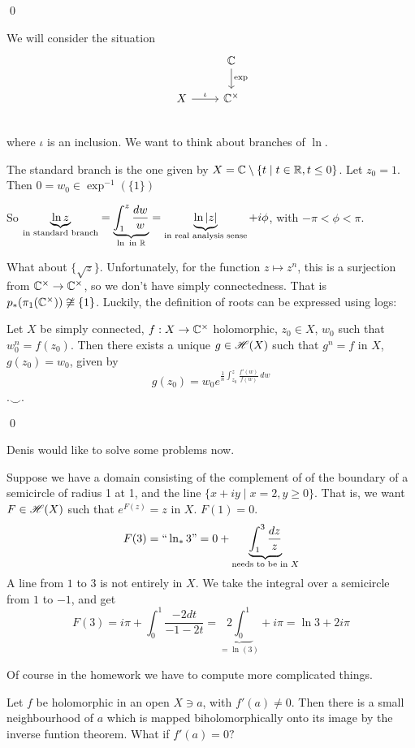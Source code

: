 \documentclass[x11names,reqno,14pt]{extarticle}
\begin{document}
\qed

We will consider the situation
\[
\begin{tikzcd}
& \C \ar[d, "\exp"] \\ X \ar[r, "\iota"] & \C^\times \\ 
\end{tikzcd}
\]
where $\iota$ is an inclusion. We want to think about branches of $\ln$. 

The standard branch is the one given by $X = \mathbb{C}\setminus\{t \mid t \in \mathbb{R}, t \leq0 \}$. Let $z_0 = 1$. Then $0 = w_0\in \exp^{-1}(\{1\})$

So $\underbrace{\ln z}_{\text{in standard branch}} = \underbrace{\int_1^z\frac{dw}{w}}_{\ln \text{ in }\mathbb{R}} = \underbrace{\ln|z|}_{\text{in real analysis sense}} + i\phi$, with $-\pi < \phi < \pi$.

What about $\{\sqrt{z}\}$. Unfortunately, for the function $z\mapsto z^n$, this is a surjection from $\mathbb{C}^\times\to\mathbb{C}^\times$, so we don't have simply connectedness. That is $p_*(\pi_1(\mathbb{C}^\times)) \not\cong \{1\}$. Luckily, the definition of roots can be expressed using logs:

\thm

Let $X$ be simply connected, $f:X\to\mathbb{C}^\times$ holomorphic, $z_0 \in X$, $w_0$ such that $w_0^n = f(z_0)$. Then there exists a unique $g \in \mathscr{H}(X)$ such that $g^n = f$ in $X$, $g(z_0) = w_0$, given by
\[
g(z_0) = w_0e^{\frac{1}{n}\int_{z_0}^z\frac{f'(w)}{f(w)}\,dw}
\] 

\proof

$\cdot\smile\cdot$

\qed

Denis would like to solve some problems now. 

Suppose we have a domain consisting of the complement of of the boundary of a semicircle of radius 1 at 1, and the line $\{x + iy \mid x = 2, y \geq 0\}$. That is, we want $F \in\mathscr{H}(X)$ such that $e^{F(z)} = z$ in $X$. $F(1) = 0$. 
\[
F(3) = ``\ln_* 3" = 0 + \underbrace{\int_1^3\frac{dz}{z}}_{\text{needs to be in }X}
\]
A line from $1$ to $3$ is not entirely in $X$. We take the integral over a semicircle from $1$ to $-1$, and get
\[
F(3) =i\pi + \int_0^1\frac{-2dt}{-1 - 2t} = \underbrace{2\int_0^1}_{=\ln(3)} + i\pi = \ln 3 + 2i\pi
\]

Of course in the homework we have to compute more complicated things.

Let $f$ be holomorphic in an open $X\ni a$, with $f'(a)\neq0$. Then there is a small neighbourhood of $a$ which is mapped biholomorphically onto its image by the inverse funtion theorem. What if $f'(a) = 0?$
\end{document}
